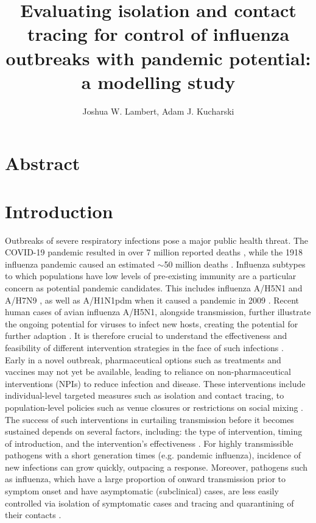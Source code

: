 \documentclass{article}
\title{Evaluating isolation and contact tracing for control of influenza outbreaks with pandemic potential: a modelling study}
\author{Joshua W. Lambert, Adam J. Kucharski}
\date{}
\begin{document}
\maketitle

\section*{Abstract}

\section*{Introduction}

Outbreaks of severe respiratory infections pose a major public health threat. The COVID-19 pandemic resulted in over 7 million reported deaths \citep{whocovid-19dashboardCOVID19DeathsWHO}, while the 1918 influenza pandemic caused an estimated $\sim$50 million deaths \citep{johnsonUpdatingAccountsGlobal2002}. Influenza subtypes to which populations have low levels of pre-existing immunity are a particular concern as potential pandemic candidates. This includes influenza A/H5N1 \citep{Ward2024.12.11.24318702} and A/H7N9 \citep{tannerPandemicPotentialAvian2015}, as well as A/H1N1pdm when it caused a pandemic in 2009 \citep{fraserPandemicPotentialStrain2009}. Recent human cases of avian influenza A/H5N1, alongside transmission, further illustrate the ongoing potential for viruses to infect new hosts, creating the potential for further adaption \citep{antiaRoleEvolutionEmergence2003, gargHighlyPathogenicAvian2025, peacockGlobalH5N1Influenza2025}. It is therefore crucial to understand the effectiveness and feasibility of different intervention strategies in the face of such infections \citep{fraserFactorsThatMake2004, kucharskiControllingMinorOutbreaks2024}. \\

Early in a novel outbreak, pharmaceutical options such as treatments and vaccines may not yet be available, leading to reliance on non-pharmaceutical interventions (NPIs) to reduce infection and disease. These interventions include individual-level targeted measures such as isolation and contact tracing, to population-level policies such as venue closures or restrictions on social mixing \citep{haugRankingEffectivenessWorldwide2020, sharmaUnderstandingEffectivenessGovernment2021}. The success of such interventions in curtailing transmission before it becomes sustained depends on several factors, including: the type of intervention, timing of introduction, and the intervention's effectiveness \citep{longiniContainingPandemicInfluenza2005}. For highly transmissible pathogens with a short generation times (e.g. pandemic influenza), incidence of new infections can grow quickly, outpacing a response. Moreover, pathogens such as influenza, which have a large proportion of onward transmission prior to symptom onset and have asymptomatic (subclinical) cases, are less easily controlled via isolation of symptomatic cases and tracing and quarantining of their contacts \citep{fraserFactorsThatMake2004}. \\
\end{document}
